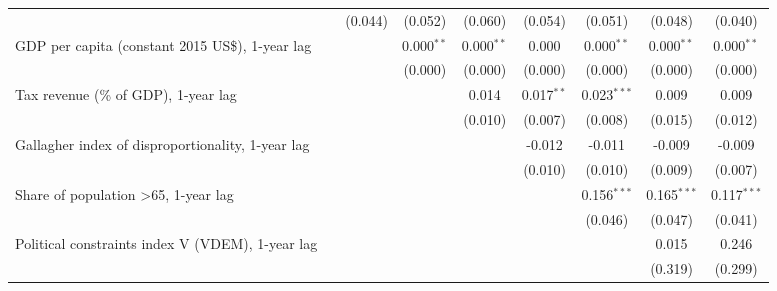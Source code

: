 \begin{table}[htbp]
\begin{tabular}{lcccccccc}
                                                                               &               & (0.044)       & (0.052)        & (0.060)       & (0.054)       & (0.051)        & (0.048)       & (0.040)\\   
      GDP per capita (constant 2015 US\$), 1-year lag                          &               &               & 0.000$^{**}$   & 0.000$^{**}$  & 0.000         & 0.000$^{**}$   & 0.000$^{**}$  & 0.000$^{**}$\\   
                                                                               &               &               & (0.000)        & (0.000)       & (0.000)       & (0.000)        & (0.000)       & (0.000)\\   
      Tax revenue (\% of GDP), 1-year lag                                      &               &               &                & 0.014         & 0.017$^{**}$  & 0.023$^{***}$  & 0.009         & 0.009\\   
                                                                               &               &               &                & (0.010)       & (0.007)       & (0.008)        & (0.015)       & (0.012)\\   
      Gallagher index of disproportionality, 1-year lag                        &               &               &                &               & -0.012        & -0.011         & -0.009        & -0.009\\   
                                                                               &               &               &                &               & (0.010)       & (0.010)        & (0.009)       & (0.007)\\   
      Share of population >65, 1-year lag                                      &               &               &                &               &               & 0.156$^{***}$  & 0.165$^{***}$ & 0.117$^{***}$\\   
                                                                               &               &               &                &               &               & (0.046)        & (0.047)       & (0.041)\\   
      Political constraints index V (VDEM), 1-year lag                         &               &               &                &               &               &                & 0.015         & 0.246\\   
                                                                               &               &               &                &               &               &                & (0.319)       & (0.299)\\   

\end{tabular}
\end{table}
